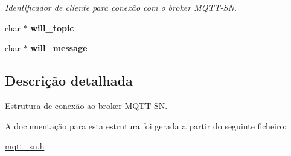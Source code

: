\begin{DoxyCompactItemize}
\begin{DoxyCompactList}\small\item\em Identificador de cliente para conexão com o broker M\+Q\+T\+T-\/\+S\+N. \end{DoxyCompactList}\item 
\hypertarget{structmqtt__sn__con__t_a23561785b3c6cff4ce4bdb8c1a75b571}{char $\ast$ {\bfseries will\+\_\+topic}}\label{structmqtt__sn__con__t_a23561785b3c6cff4ce4bdb8c1a75b571}

\item 
\hypertarget{structmqtt__sn__con__t_a70c7f56bdf5d7086550c75ac8bc98a08}{char $\ast$ {\bfseries will\+\_\+message}}\label{structmqtt__sn__con__t_a70c7f56bdf5d7086550c75ac8bc98a08}

\end{DoxyCompactItemize}


\subsection{Descrição detalhada}
Estrutura de conexão ao broker M\+Q\+T\+T-\/\+S\+N. 

A documentação para esta estrutura foi gerada a partir do seguinte ficheiro\+:\begin{DoxyCompactItemize}
\item 
\hyperlink{mqtt__sn_8h}{mqtt\+\_\+sn.\+h}\end{DoxyCompactItemize}
